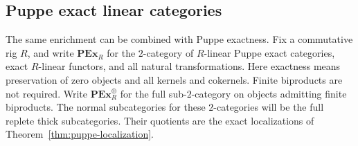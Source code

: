 \documentclass[11pt,reqno,a4paper]{amsart}
\theoremstyle{definition}
\theoremstyle{remark}
\newcommand{\0}{\mathbf{0}}
\renewcommand{\1}{\mathbf{1}}
\begin{document}
\subsection{Puppe exact linear categories}\label{subsec:puppe-linear}

The same enrichment can be combined with Puppe exactness. Fix a
commutative rig $R$, and write $\mathbf{PEx}_{R}$ for the
$2$-category of $R$-linear Puppe exact categories, exact
$R$-linear functors, and all natural transformations. Here
exactness means preservation of zero objects and all kernels
and cokernels. Finite biproducts are not required. Write
$\mathbf{PEx}_{R}^{\oplus}$ for the full sub-$2$-category on
objects admitting finite biproducts. The normal subcategories
for these $2$-categories will be the full replete
thick subcategories. Their quotients are the exact localizations
of Theorem~\ref{thm:puppe-localization}.
\end{document}
